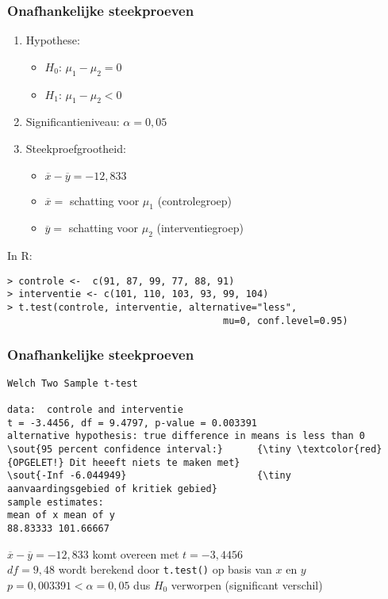\documentclass[aspectratio=169]{beamer}
\begin{document}
\begin{frame}[fragile]
  \frametitle{Onafhankelijke steekproeven}
\begin{enumerate}
  \item Hypothese:
    \begin{itemize}
     \item $H_0$: $\mu_1 - \mu_2 = 0$
     \item $H_1$: $\mu_1 - \mu_2 < 0$
    \end{itemize}
  \item Significantieniveau: $\alpha = 0,05$
  \item Steekproefgrootheid:
    \begin{itemize}
     \item $\overline{x}-\overline{y} = -12,833$
     \item $\overline{x} =$ schatting voor $\mu_1$ (controlegroep) 
     \item $\overline{y} =$ schatting voor $\mu_2$ (interventiegroep) 
    \end{itemize}
\end{enumerate}
\vfill
In R:
{\footnotesize
\begin{Verbatim}[commandchars=\\\{\}]
> controle <-  c(91, 87, 99, 77, 88, 91)
> interventie <- c(101, 110, 103, 93, 99, 104)
> t.test(controle, interventie, alternative="less",
                                      mu=0, conf.level=0.95)
\end{Verbatim}
}
\end{frame}

\begin{frame}[fragile]
  \frametitle{Onafhankelijke steekproeven}

{\footnotesize
\begin{Verbatim}[commandchars=\\\{\}]
Welch Two Sample t-test

data:  controle and interventie
t = -3.4456, df = 9.4797, p-value = 0.003391
alternative hypothesis: true difference in means is less than 0
\sout{95 percent confidence interval:}      {\tiny \textcolor{red}{OPGELET!} Dit heeeft niets te maken met}
\sout{-Inf -6.044949}                       {\tiny   aanvaardingsgebied of kritiek gebied}
sample estimates:
mean of x mean of y 
88.83333 101.66667
\end{Verbatim}
}
\vfill
$\overline{x}-\overline{y}=-12,833$ komt overeen met $t=-3,4456$\\
$df=9,48$ wordt berekend door \texttt{t.test()} op basis van $x$ en $y$\\
$p = 0,003391 < \alpha = 0,05$ dus $H_0$ verworpen (significant verschil)
\end{frame}
\end{document}

